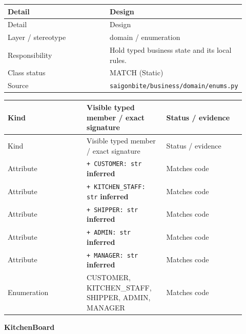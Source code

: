 \begin{longtable}{>{\raggedright\arraybackslash}p{0.4600\linewidth}>{\raggedright\arraybackslash}p{0.4600\linewidth}}
Detail & Design \\
\hline\endfirsthead
Detail & Design \\
\hline\endhead
Layer / stereotype & domain / \guillemotleft{}enumeration\guillemotright{} \\
Responsibility & Hold typed business state and its local rules. \\
Class status & MATCH (Static) \\
Source & \texttt{saigonbite/\allowbreak{}business/\allowbreak{}domain/\allowbreak{}enums.\allowbreak{}py} \\
\end{longtable}
\begin{longtable}{>{\raggedright\arraybackslash}p{0.3067\linewidth}>{\raggedright\arraybackslash}p{0.3067\linewidth}>{\raggedright\arraybackslash}p{0.3067\linewidth}}
Kind & Visible typed member / exact signature & Status / evidence \\
\hline\endfirsthead
Kind & Visible typed member / exact signature & Status / evidence \\
\hline\endhead
Attribute & \texttt{+ CUSTOMER: str} \textbf{inferred} & Matches code \\
Attribute & \texttt{+ KITCHEN\_\allowbreak{}STAFF: str} \textbf{inferred} & Matches code \\
Attribute & \texttt{+ SHIPPER: str} \textbf{inferred} & Matches code \\
Attribute & \texttt{+ ADMIN: str} \textbf{inferred} & Matches code \\
Attribute & \texttt{+ MANAGER: str} \textbf{inferred} & Matches code \\
Enumeration & CUSTOMER, KITCHEN\_STAFF, SHIPPER, ADMIN, MANAGER & Matches code \\
\end{longtable}
\textbf{KitchenBoard}

